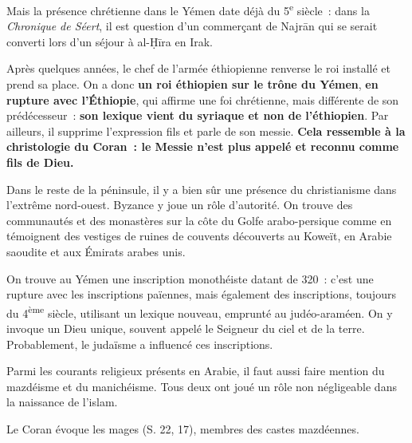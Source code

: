 Mais la présence chrétienne dans le Yémen date déjà du
5\textsuperscript{e} siècle~: dans la \emph{Chronique de
Séert}, il
est question d'un commerçant de Najrān qui se serait converti lors d'un
séjour à al-Ḥīra en Irak.

Après quelques années, le chef de l'armée éthiopienne renverse le roi
installé et prend sa place. On a donc \textbf{un roi éthiopien sur le
trône du Yémen}, \textbf{en rupture avec l'Éthiopie}, qui affirme une
foi chrétienne, mais différente de son prédécesseur~: \textbf{son
lexique vient du syriaque et non de l'éthiopien}. Par ailleurs, il
supprime l'expression fils et parle de son messie. \textbf{Cela
ressemble à la christologie du Coran~: le Messie n'est plus appelé et
reconnu comme fils de Dieu.}

Dans le reste de la péninsule, il y a bien sûr une présence du
christianisme dans l'extrême nord-ouest. Byzance y joue un rôle
d'autorité. On trouve des communautés et des monastères sur la côte du
Golfe arabo-persique comme en témoignent des vestiges de ruines de
couvents découverts au Koweït, en Arabie saoudite et aux Émirats arabes
unis.

On trouve au Yémen une inscription monothéiste datant de 320~: c'est une
rupture avec les inscriptions païennes, mais également des inscriptions,
toujours du 4\textsuperscript{ème} siècle, utilisant un lexique nouveau,
emprunté au judéo-araméen. On y invoque un Dieu unique, souvent appelé
le Seigneur du ciel et de la terre. Probablement, le judaïsme a
influencé ces inscriptions.


Parmi les courants religieux présents en Arabie, il faut aussi faire
mention du mazdéisme et du manichéisme. Tous deux ont joué un rôle non négligeable
dans la naissance de l'islam.

Le Coran évoque les mages (S. 22, 17), membres des castes mazdéennes.


